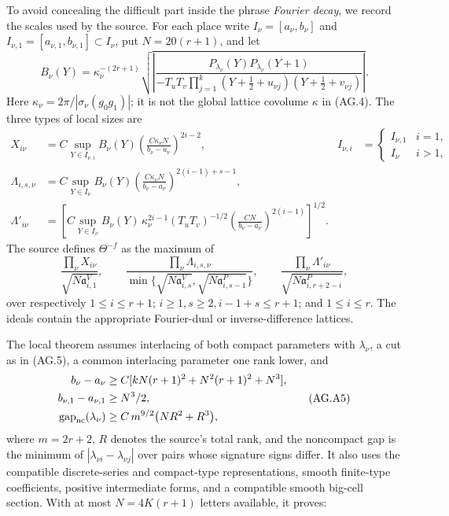 To avoid concealing the difficult part inside the phrase
\emph{Fourier decay}, we record the scales used by the source.
For each place write \(I_\nu=[a_\nu,b_\nu]\) and
\(I_{\nu,1}=[a_{\nu,1},b_{\nu,1}]\subset I_\nu\), put
\(N=20(r+1)\), and let
\[
 B_\nu(Y)=\kappa_\nu^{-(2r+1)}
 \sqrt{\left|
 \frac{P_{\lambda_\nu}(Y)P_{\lambda_\nu}(Y+1)}
 {-T_uT_v\prod_{j=1}^k
       (Y+\tfrac12+u_{\nu j})(Y+\tfrac12+v_{\nu j})}
                    \right|}.
\]
Here \(\kappa_\nu=2\pi/|\sigma_\nu(g_0g_1)|\);
it is not the global lattice covolume \(\kappa\) in (AG.4).
The three types of local sizes are
\begin{align*}
 X_{i\nu}
 &=C\sup_{Y\in I_{\nu,i}}B_\nu(Y)
       \left(\frac{C\kappa_\nu N}{b_\nu-a_\nu}\right)^{2i-2},
 & I_{\nu,i}&=\begin{cases}I_{\nu,1}&i=1,\\I_\nu&i>1,\end{cases}\\
 \Lambda_{i,s,\nu}
 &=C\sup_{Y\in I_\nu}B_\nu(Y)
       \left(\frac{C\kappa_\nu N}{b_\nu-a_\nu}\right)^{2(i-1)+s-1},\\
 \Lambda'_{i\nu}
 &=\left[
 C\sup_{Y\in I_\nu}B_\nu(Y)\,
 \kappa_\nu^{2i-1}(T_uT_v)^{-1/2}
       \left(\frac{CN}{b_\nu-a_\nu}\right)^{2(i-1)}
        \right]^{1/2}.
\end{align*}
The source defines \(\Theta^{-f}\) as the maximum of
\[
 \frac{\prod_\nu X_{i\nu}}{\sqrt{N\mathfrak a^V_{i,1}}},
 \qquad
 \frac{\prod_\nu\Lambda_{i,s,\nu}}
 {\min\{\sqrt{N\mathfrak a^V_{i,s}},
                   \sqrt{N\mathfrak a^P_{i,s-1}}\}},
 \qquad
 \frac{\prod_\nu\Lambda'_{i\nu}}
                   {\sqrt{N\mathfrak a^P_{i,r+2-i}}},
                                                               \tag{AG.A4}
\]
over respectively \(1\le i\le r+1\);
\(i\ge1,s\ge2,i-1+s\le r+1\);
and \(1\le i\le r\).
The ideals contain the appropriate Fourier-dual or
inverse-difference lattices.

The local theorem assumes interlacing of both compact
parameters with \(\lambda_\nu\), a cut as in (AG.5), a common
interlacing parameter one rank lower, and
\[
 \begin{split}
 b_\nu-a_\nu&\ge
 C[kN(r+1)^2+N^2(r+1)^2+N^3],\\
 b_{\nu,1}-a_{\nu,1}&\ge N^3/2,\\
 \operatorname{gap}_{\rm nc}(\lambda_\nu)&\ge
 C\,m^{9/2}\bigl(NR^2+R^3\bigr),
 \end{split}                                                   \tag{AG.A5}
\]
where \(m=2r+2\), \(R\) denotes the source's total rank, and
the noncompact gap is the minimum of
\(|\lambda_{\nu i}-\lambda_{\nu j}|\) over pairs whose signature
signs differ.
It also uses the compatible discrete-series and compact-type
representations, smooth finite-type coefficients, positive
intermediate forms, and a compatible smooth big-cell section.
With at most \(N=4K(r+1)\) letters available, it proves:

